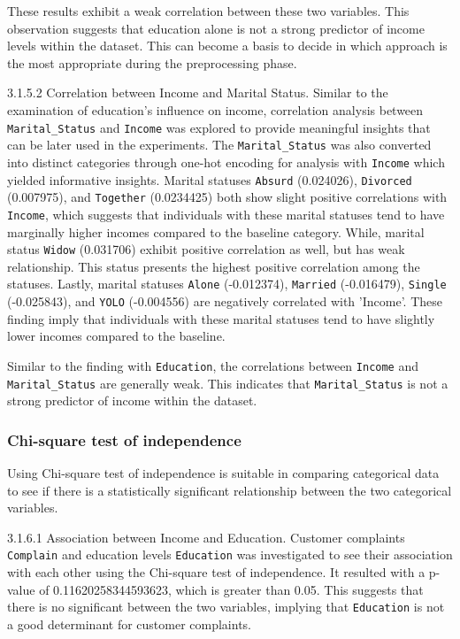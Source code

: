     These results exhibit a weak correlation between these two variables. This observation suggests that education alone is not a strong predictor of income levels within the dataset. This can become a basis to decide in which approach is the most appropriate during the preprocessing phase.

    3.1.5.2 Correlation between Income and Marital Status. Similar to the examination of education's influence on income, correlation analysis between \texttt{Marital_Status} and \texttt{Income} was explored to provide meaningful insights that can be later used in the experiments. The \texttt{Marital_Status} was also converted into distinct categories through one-hot encoding for analysis with \texttt{Income} which yielded informative insights. Marital statuses \texttt{Absurd} (0.024026), \texttt{Divorced} (0.007975), and \texttt{Together} (0.0234425) both show slight positive correlations with \texttt{Income}, which suggests that individuals with these marital statuses tend to have marginally higher incomes compared to the baseline category. While, marital status \texttt{Widow} (0.031706) exhibit positive correlation as well, but has weak relationship. This status presents the highest positive correlation among the statuses. Lastly, marital statuses \texttt{Alone} (-0.012374), \texttt{Married} (-0.016479), \texttt{Single} (-0.025843), and \texttt{YOLO} (-0.004556) are negatively correlated with 'Income'. These finding imply that individuals with these marital statuses tend to have slightly lower incomes compared to the baseline.

    Similar to the finding with \texttt{Education}, the correlations between \texttt{Income} and \texttt{Marital_Status} are generally weak. This indicates that \texttt{Marital_Status} is not a strong predictor of income within the dataset.

\subsubsection{Chi-square test of independence}

Using Chi-square test of independence is suitable in comparing categorical data to see if there is a statistically significant relationship between the two categorical variables.

    3.1.6.1 Association between Income and Education. Customer complaints \texttt{Complain} and education levels \texttt{Education} was investigated to see their association with each other using the Chi-square test of independence. It resulted with a p-value of 0.11620258344593623, which is greater than 0.05. This suggests that there is no significant between the two variables, implying that \texttt{Education} is not a good determinant for customer complaints.

